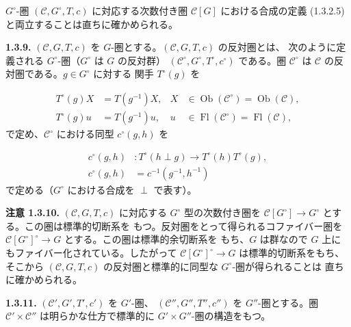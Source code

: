 \clearpage
{}%
$G^\circ$-圏 $(\mathcal C,G^\circ,T,c)$ に対応する次数付き圏 $\mathcal C[G]$
における合成の定義 (1.3.2.5) と両立することは直ちに確かめられる。

\noindent\textbf{1.3.9.}\quad
$(\mathcal C,G,T,c)$ を $G$-圏とする。$(\mathcal C,G,T,c)$ の反対圏とは、
次のように定義される $G^\circ$-圏（$G^\circ$ は $G$ の反対群）
$(\mathcal C^\circ,G^\circ,T^\circ,c^\circ)$ である。圏
$\mathcal C^\circ$ は $\mathcal C$ の反対圏である。$g\in G^\circ$ に対する
関手 $T^\circ(g)$ を

\begin{equation}
  \begin{aligned}
    T^\circ(g)X &= T(g^{-1})X,
      & X&\in\operatorname{Ob}(\mathcal C^\circ)
             =\operatorname{Ob}(\mathcal C),\\
    T^\circ(g)u &= T(g^{-1})u,
      & u&\in\operatorname{Fl}(\mathcal C^\circ)
             =\operatorname{Fl}(\mathcal C),
  \end{aligned}
  \tag{1.3.9.1}
\end{equation}
で定め、$\mathcal C^\circ$ における同型 $c^\circ(g,h)$ を

\begin{equation}
  \begin{aligned}
    c^\circ(g,h)&\colon
      T^\circ(h\perp g)\longrightarrow T^\circ(h)T^\circ(g),\\
    c^\circ(g,h)&=c^{-1}(g^{-1},h^{-1})
  \end{aligned}
  \tag{1.3.9.2}
\end{equation}
で定める（$G^\circ$ における合成を $\perp$ で表す）。

\noindent\textbf{注意 1.3.10.}\quad
$(\mathcal C,G,T,c)$ に対応する $G^\circ$ 型の次数付き圏を
$\mathcal C[G^\circ]\longrightarrow G^\circ$ とする。この圏は標準的切断系を
もつ。反対圏をとって得られるコファイバー圏を
$\mathcal C[G^\circ]^\circ\longrightarrow G$ とする。この圏は標準的余切断系を
もち、$G$ は群なので $G$ 上にもファイバー化されている。したがって
$\mathcal C[G^\circ]^\circ\longrightarrow G$ は標準的切断系をもち、そこから
$(\mathcal C,G,T,c)$ の反対圏と標準的に同型な $G^\circ$-圏が得られることは
直ちに確かめられる。

\noindent\textbf{1.3.11.}\quad
$(\mathcal C',G',T',c')$ を $G'$-圏、
$(\mathcal C'',G'',T'',c'')$ を $G''$-圏とする。圏
$\mathcal C'\times\mathcal C''$ は明らかな仕方で標準的に
$G'\times G''$-圏の構造をもつ。

